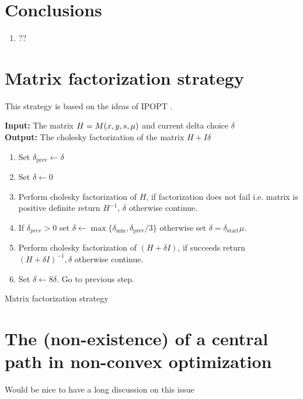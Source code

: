 \documentclass{article}
\begin{document}
\section{Conclusions}
\begin{enumerate}
\item ??
\end{enumerate}





\appendix

\section{Matrix factorization strategy}

This strategy is based on the ideas of IPOPT \cite[Algorithm IC]{wachter2006implementation}.

\begin{algorithm}[H]
\textbf{Input:} The matrix $H = M(x,y,s,\mu)$ and current delta choice $\delta$ \\
\textbf{Output:} The cholesky factorization of the matrix $H + I \delta$
\begin{enumerate}[label*=A.{\arabic*}]
\item Set $\delta_{\text{prev}} \gets \delta$
\item Set $\delta \gets 0$
\item Perform cholesky factorization of $H$, if factorization does not fail i.e. matrix is positive definite return $H^{-1}$, $\delta$ otherwise continue.
\item If $\delta_{prev} > 0$ set $\delta \gets \max\{ \delta_{\min}, \delta_{\text{prev}} / 3 \}$ otherwise set $\delta = \delta_{\text{start}} \mu$.
\item Perform cholesky factorization of $(H + \delta I)$, if succeeds return $(H + \delta I)^{-1}, \delta$ otherwise continue.
\item Set $\delta \gets 8 \delta$. Go to previous step.
\end{enumerate}
\caption{Matrix factorization strategy}\label{alg:mat-fact}
\end{algorithm}

\section{The (non-existence) of a central path in non-convex optimization}\label{app:non-existence-of-central-path}

Would be nice to have a long discussion on this issue
\end{document}
